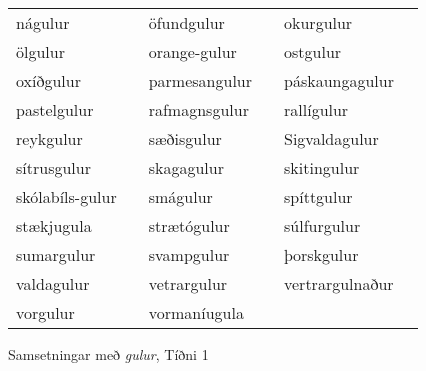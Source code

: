 \documentclass[../samsetningasafn.tex]{subfiles}
\begin{document}
\begin{wordlist}[H]
\begin{tcolorbox}
\begin{tabular}{BlBlBl}
		nágulur			&		& 
		öfundgulur		&		& 
		okurgulur		&		\\ 
		ölgulur			&		& 
		orange-gulur		&		& 
		ostgulur			&		\\ 
		oxíðgulur		&		& 
		parmesangulur	&		& 
		páskaungagulur	&		\\ 
		pastelgulur		&		& 
		rafmagnsgulur	&		& 
		rallígulur			&		\\ 
		reykgulur		&		& 
		sæðisgulur		&		& 
		Sigvaldagulur	&		\\ 
		sítrusgulur		&		& 
		skagagulur		&		& 
		skitingulur		&		\\ 
		skólabíls-gulur	&		& 
		smágulur		&		& 
		spíttgulur		&		\\ 
		stækjugula		&		& 
		strætógulur		&		& 
		súlfurgulur		&		\\ 
		sumargulur		&		& 
		svampgulur		&		& 
		þorskgulur		&		\\ 
		valdagulur		&		& 
		vetrargulur		&		& 
		vertrargulnaður	&		\\ 
		vorgulur			&		& 
		vormaníugula	&		& 
						&
	\end{tabular}

\end{tcolorbox}
	\caption{Samsetningar með \textit{gulur}, Tíðni 1}
	\label{listi:gult.1}
\end{wordlist}						
\end{document}
